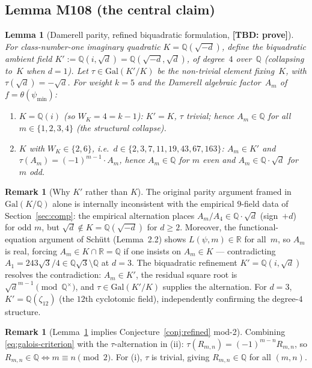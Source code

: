 \documentclass[10pt]{article}
\newtheorem{lemma}[theorem]{Lemma}
\theoremstyle{definition}
\newtheorem{remark}[theorem]{Remark}
\newcommand{\Q}{\mathbb{Q}}
\newcommand{\R}{\mathbb{R}}
\begin{document}
\subsection{Lemma M108 (the central claim)}

\begin{lemma}[Damerell parity, refined biquadratic formulation, \textbf{[TBD: prove]}]
\label{lem:M108}
For class-number-one imaginary quadratic $K = \Q(\sqrt{-d})$, define the
\emph{biquadratic ambient field}
$K' := \Q(i, \sqrt{d}) = \Q(\sqrt{-d}, \sqrt{d})$,
of degree~$4$ over~$\Q$ (collapsing to~$K$ when $d = 1$).  Let $\tau \in
\mathrm{Gal}(K'/K)$ be the non-trivial element fixing~$K$, with $\tau(\sqrt{d})
= -\sqrt{d}$.  For weight $k = 5$ and the Damerell algebraic factor~$A_m$ of
$f = \theta(\psi_{\min})$:
\begin{enumerate}[label=(\roman*)]
  \item $K = \Q(i)$ (so $W_K = 4 = k-1$): $K' = K$, $\tau$ trivial; hence
        $A_m \in \Q$ for all $m \in \{1, 2, 3, 4\}$ (the structural collapse).
  \item $K$ with $W_K \in \{2, 6\}$, i.e.\ $d \in \{2, 3, 7, 11, 19, 43, 67, 163\}$:
        $A_m \in K'$ and $\tau(A_m) = (-1)^{m-1} \cdot A_m$, hence $A_m \in \Q$
        for $m$ even and $A_m \in \Q \cdot \sqrt{d}$ for $m$ odd.
\end{enumerate}
\end{lemma}

\begin{remark}[Why $K'$ rather than $K$]
The original parity argument framed in $\mathrm{Gal}(K/\Q)$ alone is internally
inconsistent with the empirical $9$-field data of Section~\ref{sec:comp}: the
empirical alternation places $A_m/A_4 \in \Q \cdot \sqrt{d}$ (sign~$+d$) for odd
$m$, but $\sqrt{d} \notin K = \Q(\sqrt{-d})$ for $d \geq 2$.  Moreover, the
functional-equation argument of Schütt \cite{Schutt2008} (Lemma~2.2) shows
$L(\psi, m) \in \R$ for all~$m$, so $A_m$ is real, forcing $A_m \in K \cap \R =
\Q$ if one insists on $A_m \in K$ --- contradicting $A_1 = 243\sqrt{3}/4 \in
\Q\sqrt{3} \setminus \Q$ at $d = 3$.  The biquadratic refinement $K' = \Q(i,
\sqrt{d})$ resolves the contradiction: $A_m \in K'$, the residual square root
is $\sqrt{d}^{m-1} \pmod{\Q^\times}$, and $\tau \in \mathrm{Gal}(K'/K)$ supplies
the alternation.  For $d = 3$, $K' = \Q(\zeta_{12})$ (the $12$th cyclotomic
field), independently confirming the degree-$4$ structure.
\end{remark}

\begin{remark}[Lemma~\ref{lem:M108} implies Conjecture~\ref{conj:refined} mod-2]
Combining \eqref{eq:galois-criterion} with the $\tau$-alternation in (ii):
$\tau(R_{m,n}) = (-1)^{m-n} R_{m,n}$, so $R_{m,n} \in \Q \Leftrightarrow m
\equiv n \pmod 2$.  For (i), $\tau$ is trivial, giving $R_{m,n} \in \Q$ for all
$(m,n)$.
\end{remark}
\end{document}
